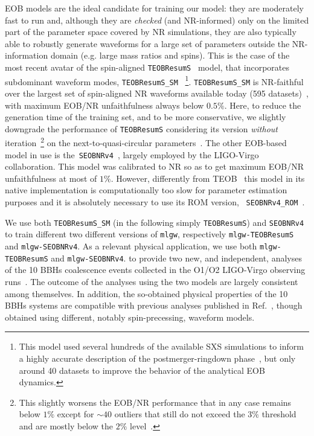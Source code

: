 \documentclass[twocolumn,showpacs,preprintnumbers,nofootinbib,prd,
superscriptaddress,10pt]{revtex4-1}
\begin{document}
EOB models are the ideal candidate for training our model: they are moderately fast to run 
and, although they are {\it checked} (and NR-informed) only on the limited part of the 
parameter space covered by NR simulations,  they are also typically able to robustly 
generate waveforms for a large set of parameters outside the NR-information 
domain (e.g. large mass ratios and spins).
This is the case of the most recent avatar of the spin-aligned \texttt{TEOBResumS}~\cite{Nagar:2018zoe} 
model, that incorporates subdominant waveform modes, \texttt{TEOBResumS\_SM}~\cite{Nagar:2019wds,Nagar:2020pcj}
\footnote{This model used several hundreds of the available SXS simulations to inform a highly 
accurate description of the postmerger-ringdown phase~\cite{Damour:2014yha}, but 
only around 40 datasets to improve the behavior of the analytical EOB dynamics.}.
\texttt{TEOBResumS\_SM} is NR-faithful over the largest set of spin-aligned NR waveforms 
available today (595 datasets)~\cite{Nagar:2020pcj}, with maximum EOB/NR unfaithfulness 
always below $0.5\%$. Here, to reduce the generation time of the training set, and to be more 
conservative, we slightly downgrade the performance of \texttt{TEOBResumS} considering 
its version {\it without} iteration~\footnote{This slightly worsens the EOB/NR performance that in
any case remains below $1\%$ except for $\sim 40$ outliers that still do not exceed the $3\%$ 
threshold and are mostly below the $2\%$ level~\cite{Riemenschneider:2020}.} on 
the next-to-quasi-circular parameters~\cite{Nagar:2020pcj}.
The other EOB-based model in use is the~\texttt{SEOBNRv4}~\cite{Taracchini:2013rva,Bohe:2016gbl},
largely employed by the LIGO-Virgo collaboration. This model was calibrated to NR so as to get  
maximum EOB/NR unfaithfulness at most of $1\%$. However, differently from 
TEOB~\cite{Nagar:2018zoe} this model in its native implementation is computationally 
too slow for parameter estimation purposes and it is absolutely necessary 
to use its ROM version, ~\texttt{SEOBNRv4\_ROM}~\cite{Bohe:2016gbl}.

We use both \texttt{TEOBResumS\_SM} (in the following simply \texttt{TEOBResumS}) 
and \texttt{SEOBNRv4} to train different two different versions of \texttt{mlgw}, respectively
\texttt{mlgw-TEOBResumS} and \texttt{mlgw-SEOBNRv4}.
As a relevant physical application, we use both 
\texttt{mlgw-TEOBResumS} and \texttt{mlgw-SEOBNRv4}.
to provide two new, and independent, analyses of the 10 BBHs 
coalescence events collected in the O1/O2 LIGO-Virgo observing 
runs~\cite{LIGOScientific:2018mvr}. The outcome of the analyses 
using the two models are largely consistent among themselves.
In addition,  the so-obtained physical properties of the 10 BBHs
systems are compatible with previous analyses published in
Ref.~\cite{LIGOScientific:2018mvr}, though obtained using
different, notably spin-precessing, waveform models.
\end{document}
